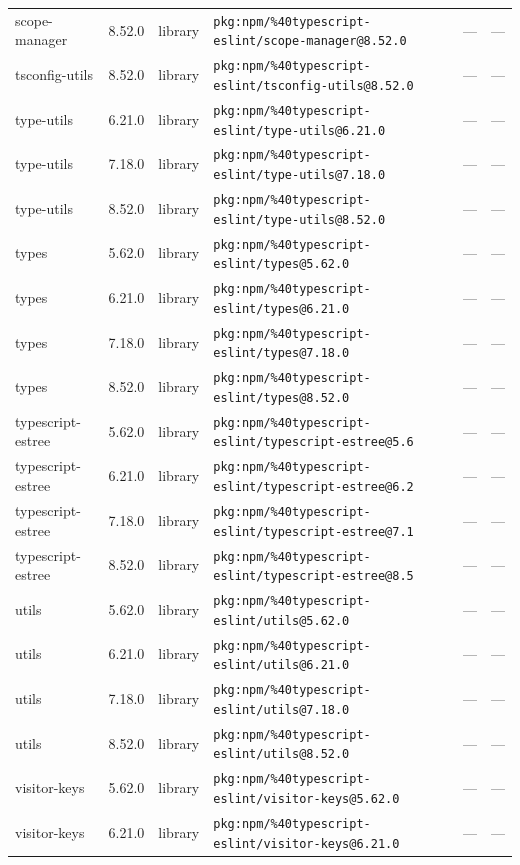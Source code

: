 \documentclass[11pt]{article}
\begin{document}
\begin{longtable}{|l|l|l|p{2.2cm}|l|p{4cm}|}
scope-manager & 8.52.0 & library & \texttt{pkg:npm/\%40typescript-eslint/scope-manager@8.52.0} & — & — \\
tsconfig-utils & 8.52.0 & library & \texttt{pkg:npm/\%40typescript-eslint/tsconfig-utils@8.52.0} & — & — \\
type-utils & 6.21.0 & library & \texttt{pkg:npm/\%40typescript-eslint/type-utils@6.21.0} & — & — \\
type-utils & 7.18.0 & library & \texttt{pkg:npm/\%40typescript-eslint/type-utils@7.18.0} & — & — \\
type-utils & 8.52.0 & library & \texttt{pkg:npm/\%40typescript-eslint/type-utils@8.52.0} & — & — \\
types & 5.62.0 & library & \texttt{pkg:npm/\%40typescript-eslint/types@5.62.0} & — & — \\
types & 6.21.0 & library & \texttt{pkg:npm/\%40typescript-eslint/types@6.21.0} & — & — \\
types & 7.18.0 & library & \texttt{pkg:npm/\%40typescript-eslint/types@7.18.0} & — & — \\
types & 8.52.0 & library & \texttt{pkg:npm/\%40typescript-eslint/types@8.52.0} & — & — \\
typescript-estree & 5.62.0 & library & \texttt{pkg:npm/\%40typescript-eslint/typescript-estree@5.6} & — & — \\
typescript-estree & 6.21.0 & library & \texttt{pkg:npm/\%40typescript-eslint/typescript-estree@6.2} & — & — \\
typescript-estree & 7.18.0 & library & \texttt{pkg:npm/\%40typescript-eslint/typescript-estree@7.1} & — & — \\
typescript-estree & 8.52.0 & library & \texttt{pkg:npm/\%40typescript-eslint/typescript-estree@8.5} & — & — \\
utils & 5.62.0 & library & \texttt{pkg:npm/\%40typescript-eslint/utils@5.62.0} & — & — \\
utils & 6.21.0 & library & \texttt{pkg:npm/\%40typescript-eslint/utils@6.21.0} & — & — \\
utils & 7.18.0 & library & \texttt{pkg:npm/\%40typescript-eslint/utils@7.18.0} & — & — \\
utils & 8.52.0 & library & \texttt{pkg:npm/\%40typescript-eslint/utils@8.52.0} & — & — \\
visitor-keys & 5.62.0 & library & \texttt{pkg:npm/\%40typescript-eslint/visitor-keys@5.62.0} & — & — \\
visitor-keys & 6.21.0 & library & \texttt{pkg:npm/\%40typescript-eslint/visitor-keys@6.21.0} & — & — \\

\end{longtable}
\end{document}
